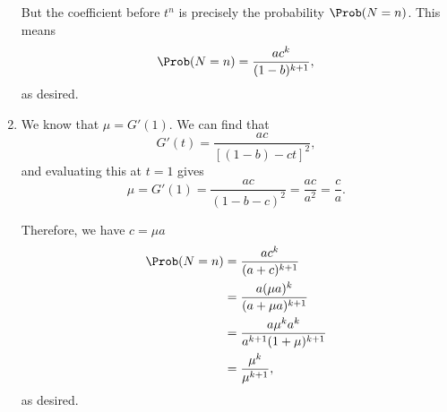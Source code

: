\begin{enumerate}
          But the coefficient before \(t^n\) is precisely the probability \(\Prob(N = n)\). This means
          \[
              \Prob(N = n) = \frac{ac^k}{(1 - b)^{k + 1}},
          \]
          as desired.

    \item We know that \(\mu = G'(1)\). We can find that
          \[
              G'(t) = \frac{ac}{[(1 - b) - ct]^2},
          \]
          and evaluating this at \(t = 1\) gives
          \[
              \mu = G'(1) = \frac{ac}{(1 - b - c)^2} = \frac{ac}{a^2} = \frac{c}{a}.
          \]

          Therefore, we have \(c = \mu a\)
          \begin{align*}
              \Prob(N = n) & = \frac{a c^k}{(a + c)^{k + 1}}                   \\
                           & = \frac{a (\mu a)^k}{(a + \mu a)^{k + 1}}         \\
                           & = \frac{a \mu^k a^k}{a^{k + 1} (1 + \mu)^{k + 1}} \\
                           & = \frac{\mu^k}{\mu^{k + 1}},
          \end{align*}
          as desired.
\end{enumerate}